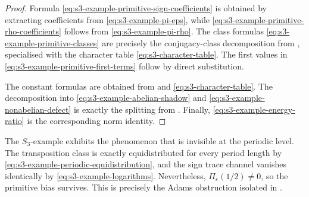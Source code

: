 \begin{proof}
  Formula \eqref{eq:s3-example-primitive-sign-coefficients} is obtained
  by extracting coefficients from \eqref{eq:s3-example-pi-eps}, while
  \eqref{eq:s3-example-primitive-rho-coefficients} follows from
  \eqref{eq:s3-example-pi-rho}. The class formulas
  \eqref{eq:s3-example-primitive-classes} are precisely the
  conjugacy-class decomposition from
  , specialised with the
  character table \eqref{eq:s3-character-table}. The first values in
  \eqref{eq:s3-example-primitive-first-terms} follow by direct
  substitution.

  The constant formulas are obtained from
   and
  \eqref{eq:s3-character-table}. The decomposition into
  \eqref{eq:s3-example-abelian-shadow} and
  \eqref{eq:s3-example-nonabelian-defect} is exactly the splitting from
  . Finally,
  \eqref{eq:s3-example-energy-ratio} is the corresponding norm identity.
\end{proof}

\begin{remark}
  The \(S_3\)-example exhibits the phenomenon that is invisible at the
  periodic level. The transposition class is exactly equidistributed for
  every period length by \eqref{eq:s3-example-periodic-equidistribution},
  and the sign trace channel vanishes identically by
  \eqref{eq:s3-example-logarithms}. Nevertheless,
  \(\Pi_\varepsilon(1/2)\neq 0\), so the primitive bias survives. This
  is precisely the Adams obstruction isolated in
  .
\end{remark}

